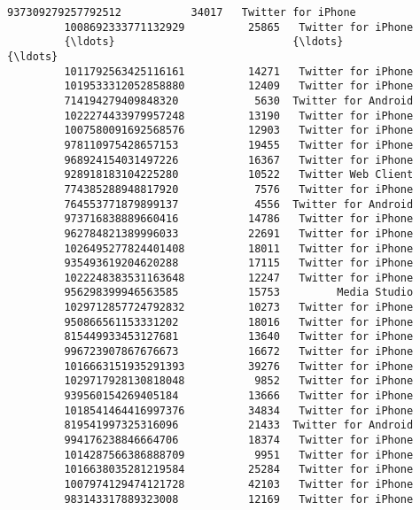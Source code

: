 \documentclass[11pt]{article}
\begin{document}
\begin{Verbatim}[commandchars=\\\{\}]
         937309279257792512           34017   Twitter for iPhone   
         1008692333771132929          25865   Twitter for iPhone   
         {\ldots}                            {\ldots}                  {\ldots}   
         1011792563425116161          14271   Twitter for iPhone   
         1019533312052858880          12409   Twitter for iPhone   
         714194279409848320            5630  Twitter for Android   
         1022274433979957248          13190   Twitter for iPhone   
         1007580091692568576          12903   Twitter for iPhone   
         978110975428657153           19455   Twitter for iPhone   
         968924154031497226           16367   Twitter for iPhone   
         928918183104225280           10522   Twitter Web Client   
         774385288948817920            7576   Twitter for iPhone   
         764553771879899137            4556  Twitter for Android   
         973716838889660416           14786   Twitter for iPhone   
         962784821389996033           22691   Twitter for iPhone   
         1026495277824401408          18011   Twitter for iPhone   
         935493619204620288           17115   Twitter for iPhone   
         1022248383531163648          12247   Twitter for iPhone   
         956298399946563585           15753         Media Studio   
         1029712857724792832          10273   Twitter for iPhone   
         950866561153331202           18016   Twitter for iPhone   
         815449933453127681           13640   Twitter for iPhone   
         996723907867676673           16672   Twitter for iPhone   
         1016663151935291393          39276   Twitter for iPhone   
         1029717928130818048           9852   Twitter for iPhone   
         939560154269405184           13666   Twitter for iPhone   
         1018541464416997376          34834   Twitter for iPhone   
         819541997325316096           21433  Twitter for Android   
         994176238846664706           18374   Twitter for iPhone   
         1014287566386888709           9951   Twitter for iPhone   
         1016638035281219584          25284   Twitter for iPhone   
         1007974129474121728          42103   Twitter for iPhone   
         983143317889323008           12169   Twitter for iPhone   
         

\end{Verbatim}
\end{document}
